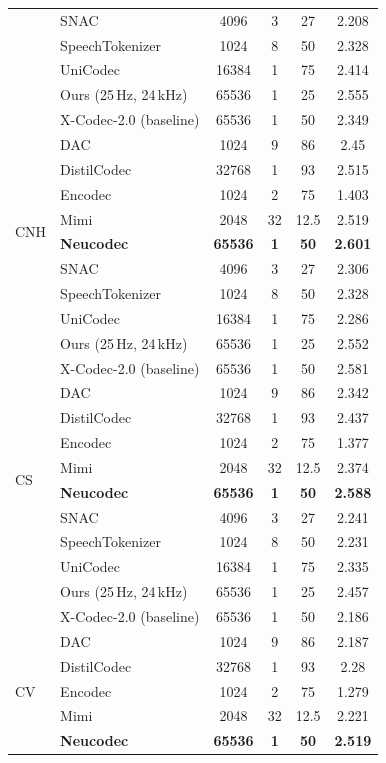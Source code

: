 \documentclass[preprint]{article}
\begin{document}
\begin{longtable}{llcccc}
  & SNAC & 4096 & 3 & 27 & 2.208 \\
  & SpeechTokenizer & 1024 & 8 & 50 & 2.328 \\
  & UniCodec & 16384 & 1 & 75 & 2.414 \\
  & Ours (25\,Hz, 24\,kHz) & 65536 & 1 & 25 & 2.555 \\
  & X-Codec-2.0 (baseline) & 65536 & 1 & 50 & 2.349 \\
\midrule
\multirow{8}{*}{CNH}
  & DAC & 1024 & 9 & 86 & 2.45 \\
  & DistilCodec & 32768 & 1 & 93 & 2.515 \\
  & Encodec & 1024 & 2 & 75 & 1.403 \\
  & Mimi & 2048 & 32 & 12.5 & 2.519 \\
  & \textbf{Neucodec} & \textbf{65536} & \textbf{1} & \textbf{50} & \textbf{2.601} \\
  & SNAC & 4096 & 3 & 27 & 2.306 \\
  & SpeechTokenizer & 1024 & 8 & 50 & 2.328 \\
  & UniCodec & 16384 & 1 & 75 & 2.286 \\
  & Ours (25\,Hz, 24\,kHz) & 65536 & 1 & 25 & 2.552 \\
  & X-Codec-2.0 (baseline) & 65536 & 1 & 50 & 2.581 \\
\midrule
\multirow{8}{*}{CS}
  & DAC & 1024 & 9 & 86 & 2.342 \\
  & DistilCodec & 32768 & 1 & 93 & 2.437 \\
  & Encodec & 1024 & 2 & 75 & 1.377 \\
  & Mimi & 2048 & 32 & 12.5 & 2.374 \\
  & \textbf{Neucodec} & \textbf{65536} & \textbf{1} & \textbf{50} & \textbf{2.588} \\
  & SNAC & 4096 & 3 & 27 & 2.241 \\
  & SpeechTokenizer & 1024 & 8 & 50 & 2.231 \\
  & UniCodec & 16384 & 1 & 75 & 2.335 \\
  & Ours (25\,Hz, 24\,kHz) & 65536 & 1 & 25 & 2.457 \\
  & X-Codec-2.0 (baseline) & 65536 & 1 & 50 & 2.186 \\
\midrule
\multirow{8}{*}{CV}
  & DAC & 1024 & 9 & 86 & 2.187 \\
  & DistilCodec & 32768 & 1 & 93 & 2.28 \\
  & Encodec & 1024 & 2 & 75 & 1.279 \\
  & Mimi & 2048 & 32 & 12.5 & 2.221 \\
  & \textbf{Neucodec} & \textbf{65536} & \textbf{1} & \textbf{50} & \textbf{2.519} \\

\end{longtable}
\end{document}
